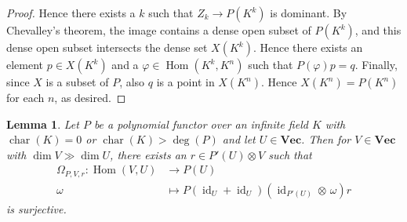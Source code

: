 \documentclass{amsart}
\theoremstyle{plain}
\newtheorem{lm}[thm]{Lemma}
\theoremstyle{definition}
\DeclareMathOperator{\cha}{char}
\DeclareMathOperator{\id}{id}
\renewcommand{\phi}{\varphi}
\DeclareMathOperator{\Hom}{Hom}
\renewcommand{\Vec}{\mathbf{Vec}}
\begin{document}
\begin{proof}
Hence there exists a $k$ such that $Z_k \to P(K^k)$ is dominant. By
Chevalley's theorem, the image contains a dense open subset of $P(K^k)$,
and this dense open subset intersects the dense set $X(K^k)$. Hence
there exists an element $p \in X(K^k)$ and a $\phi \in \Hom(K^k, K^n)$
such that $P(\phi)p=q$. Finally, since $X$ is a subset of $P$, also $q$
is a point in $X(K^n)$. Hence $X(K^n)=P(K^n)$ for each $n$, as desired.
\end{proof}

\begin{lm}
Let $P$ be a polynomial functor over an infinite field $K$ with
$\cha(K)=0$ or $\cha(K) > \deg(P)$ and let $U \in \Vec$. Then for $V \in \Vec$
with $\dim V \gg \dim U$, there exists an $r \in P'(U) \otimes V$ such that
\begin{align*}
\Omega_{P,V,r}\colon\Hom(V,U) &\to P(U)\\
\omega &\mapsto P(\id_U + \id_U)(\id_{P'(U)} \otimes \,\omega)r
\end{align*}
is surjective.
\end{lm}
\end{document}

